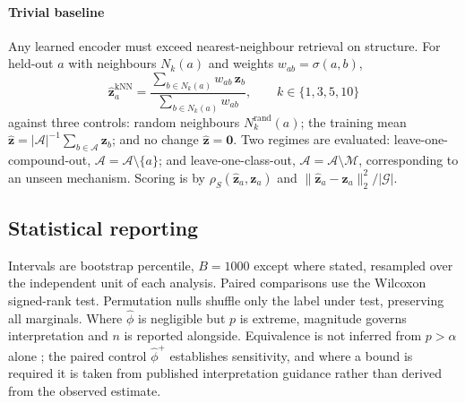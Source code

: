 \documentclass[5p,times,twocolumn]{elsarticle}
\begin{document}
\paragraph{\textbf{Trivial baseline}} Any learned encoder must exceed
nearest-neighbour retrieval on structure. For held-out $a$ with neighbours
$N_k(a)$ and weights $w_{ab}=\sigma(a,b)$,
\begin{equation}
\hat{\mathbf{z}}_a^{\mathrm{kNN}}=
\frac{\sum_{b\in N_k(a)} w_{ab}\,\mathbf{z}_b}{\sum_{b\in N_k(a)} w_{ab}},
\qquad k\in\{1,3,5,10\}
\end{equation}
against three controls: random neighbours $N_k^{\mathrm{rand}}(a)$; the training
mean $\hat{\mathbf{z}}=|\mathcal{A}|^{-1}\sum_{b\in\mathcal{A}}\mathbf{z}_b$;
and no change $\hat{\mathbf{z}}=\mathbf{0}$. Two regimes are evaluated:
leave-one-compound-out, $\mathcal{A}=\mathcal{A}\setminus\{a\}$; and
leave-one-class-out, $\mathcal{A}=\mathcal{A}\setminus\mathcal{M}$,
corresponding to an unseen mechanism. Scoring is by
$\rho_S(\hat{\mathbf{z}}_a,\mathbf{z}_a)$ and
$\|\hat{\mathbf{z}}_a-\mathbf{z}_a\|_2^2/|\mathcal{G}|$.

\subsection{\textbf{Statistical reporting}}

Intervals are bootstrap percentile, $B=1000$ except where stated, resampled over
the independent unit of each analysis. Paired comparisons use the Wilcoxon
signed-rank test. Permutation nulls shuffle only the label under test,
preserving all marginals. Where $\hat{\phi}$ is negligible but $p$ is extreme,
magnitude governs interpretation and $n$ is reported alongside. Equivalence is
not inferred from $p>\alpha$ alone \cite{lakens2017equivalence}; the paired
control $\hat{\phi}^{+}$ establishes sensitivity, and where a bound is required
it is taken from published interpretation guidance rather than derived from the
observed estimate.
\end{document}
